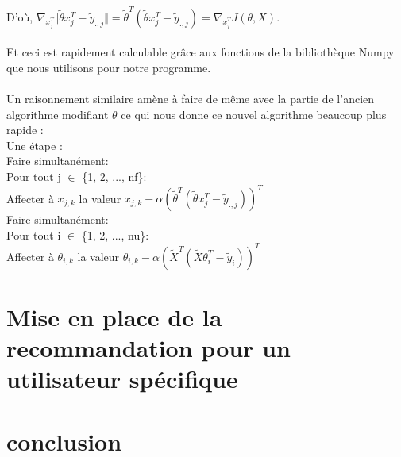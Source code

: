\documentclass[a4paper,10pt]{article}
\begin{document}
D'o\`{u}, $\nabla_{x_{j}^{T}}\Vert\tilde{\theta}x_{j}^{T}-\tilde{y}_{.,j}\Vert = \tilde{\theta}^{T}(\tilde{\theta}x_{j}^{T}-\tilde{y}_{.,j})=\nabla_{x_{j}^T} J(\theta, X)$.\\\\
Et ceci est rapidement calculable gr\^{a}ce aux fonctions de la biblioth\`eque Numpy que nous utilisons pour notre programme.\\\\
Un raisonnement similaire am\`ene \`a faire de m\^eme avec la partie de l'ancien algorithme modifiant $\theta$ ce qui nous donne ce nouvel algorithme beaucoup plus rapide :\\

\noindent Une \'{e}tape :\\
\indent Faire simultan\'{e}ment:\\
\indent \indent Pour tout j $\in$ \{1, 2, ..., nf\}:\\
\indent \indent \indent Affecter \`{a} $x_{j,k}$ la valeur $x_{j,k}-\alpha(\tilde{\theta}^{T}(\tilde{\theta}x_{j}^{T}-\tilde{y}_{.,j}))^{T}$\\
\indent Faire simultan\'{e}ment:\\
\indent \indent Pour tout i $\in$ \{1, 2, ..., nu\}:\\
\indent \indent \indent Affecter \`{a} $\theta_{i,k}$ la valeur $\theta_{i,k}-\alpha(\tilde{X}^{T}(\tilde{X}\theta_{i}^{T}-\tilde{y}_{i}))^{T}$\\

\section{Mise en place de la recommandation pour un utilisateur spécifique}
\section{conclusion}
\appendix
\end{document}

